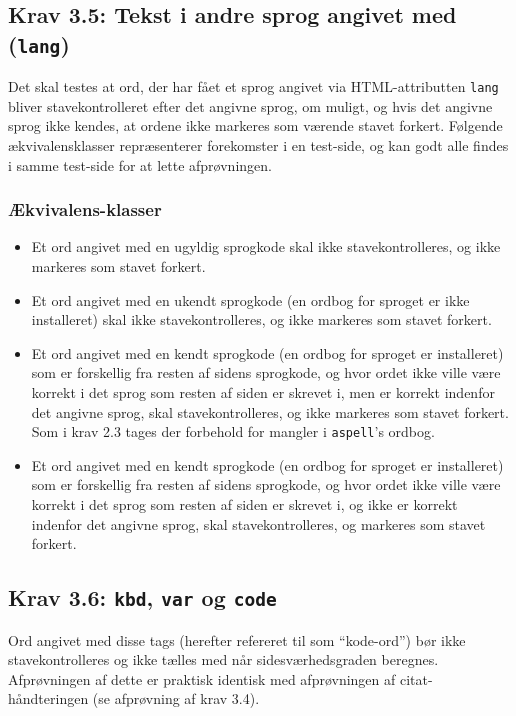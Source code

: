 \documentclass[a4paper,oneside,article]{memoir}
\begin{document}
\begin{landscape}
\subsection{Krav 3.5: Tekst i andre sprog angivet med
  (\texttt{lang})}

Det skal testes at ord, der har fået et sprog angivet via
HTML-attributten \texttt{lang} bliver stavekontrolleret efter det
angivne sprog, om muligt, og hvis det angivne sprog ikke kendes, at
ordene ikke markeres som værende stavet forkert. Følgende
ækvivalensklasser repræsenterer forekomster i en test-side, og kan
godt alle findes i samme test-side for at lette afprøvningen.

\subsubsection{Ækvivalens-klasser}
\begin{itemize}
\item Et ord angivet med en ugyldig sprogkode skal ikke
  stavekontrolleres, og ikke markeres som stavet forkert.
\item Et ord angivet med en ukendt sprogkode (en ordbog for sproget er
  ikke installeret) skal ikke stavekontrolleres, og ikke markeres som
  stavet forkert.
\item Et ord angivet med en kendt sprogkode (en ordbog for sproget er
  installeret) som er forskellig fra resten af sidens sprogkode, og
  hvor ordet ikke ville være korrekt i det sprog som resten af siden
  er skrevet i, men er korrekt indenfor det angivne sprog, skal
  stavekontrolleres, og ikke markeres som stavet forkert. Som i krav
  2.3 tages der forbehold for mangler i \texttt{aspell}'s ordbog.
\item Et ord angivet med en kendt sprogkode (en ordbog for sproget er
  installeret) som er forskellig fra resten af sidens sprogkode, og
  hvor ordet ikke ville være korrekt i det sprog som resten af siden
  er skrevet i, og ikke er korrekt indenfor det angivne sprog, skal
  stavekontrolleres, og markeres som stavet forkert.
\end{itemize}

\subsection{Krav 3.6: \texttt{kbd}, \texttt{var} og \texttt{code}}

Ord angivet med disse tags (herefter refereret til som ``kode-ord'')
bør ikke stavekontrolleres og ikke tælles med når sidesværhedsgraden
beregnes. Afprøvningen af dette er praktisk identisk med afprøvningen
af citat-håndteringen (se afprøvning af krav 3.4).


\end{landscape}
\end{document}

